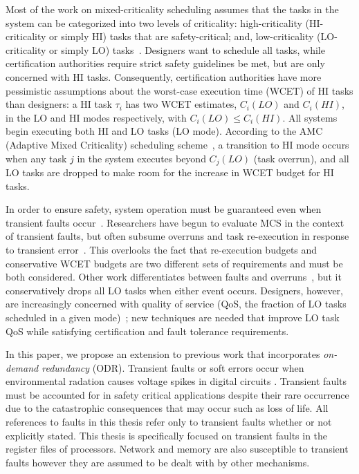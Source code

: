 \documentclass[conference]{IEEEtran}
\begin{document}
Most of the work on mixed-criticality scheduling assumes that the tasks in the system can be categorized into two levels of criticality: high-criticality  (HI-criticality or simply HI) tasks that are safety-critical; and, low-criticality (LO-criticality or simply LO) tasks~\cite{burns2013mixed}.  Designers want to schedule all tasks, while certification authorities require strict safety guidelines be met, but are only concerned with HI tasks. Consequently, certification authorities have more pessimistic assumptions about the worst-case execution time (WCET) of HI tasks than designers: a HI task $\tau_i$ has two WCET estimates, $C_i (LO)$ and $C_i (HI)$, in the LO and HI modes respectively, with $C_i (LO) \le C_i (HI)$. All systems begin executing both HI and LO tasks (LO mode). According to the AMC (Adaptive Mixed Criticality) scheduling scheme~\cite{baruah2011response}, a transition to HI mode occurs when any task $j$ in the system executes beyond $C_j (LO)$ (task overrun), and all LO tasks are dropped to make room for the increase in WCET budget for HI tasks.
	
In order to ensure safety, system operation must be guaranteed even when transient faults occur~\cite{baleani2003}. Researchers have begun to evaluate MCS in the context of transient faults, but often subsume overruns and task re-execution in response to transient error~\cite{kang2014static, huang2014scheduling}. This overlooks the fact that re-execution budgets and conservative WCET budgets are two different sets of requirements and must be both considered. Other work differentiates between faults and overruns~\cite{pathan14}, but it conservatively drops all LO tasks when either event occurs. Designers, however, are increasingly concerned with quality of service (QoS, the fraction of LO tasks scheduled in a given mode)~\cite{yip2014relaxing, burns2013mixed}; new techniques are needed that improve LO task QoS while satisfying certification and fault tolerance requirements.

	
In this paper, we propose an extension to previous work \cite{albayati2016modes} that incorporates \emph{on-demand redundancy} (ODR).
Transient faults or soft errors occur when environmental radation causes voltage spikes in digital circuits \cite{Baumann:05}. 
	Transient faults must be accounted for in safety critical applications despite their rare occurrence due to the catastrophic consequences that may occur such as loss of life.
	All references to faults in this thesis refer only to transient faults whether or not explicitly stated. 
	This thesis is specifically focused on transient faults in the register files of processors. 
	Network \cite{radetzki2013methods} and memory \cite{Baumann:05} are also susceptible to transient faults however they are assumed to be dealt with by other mechanisms.
\end{document}
